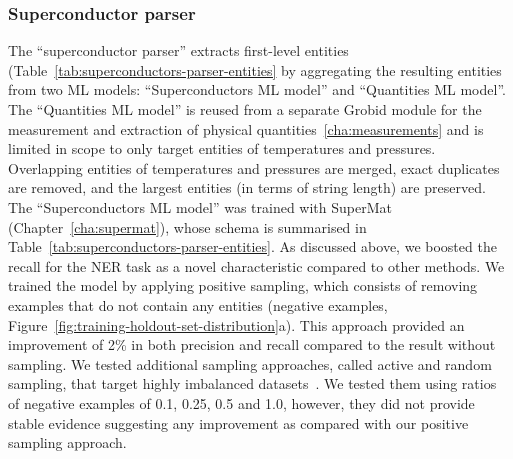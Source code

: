 \subsubsection{Superconductor parser}
The ``superconductor parser'' extracts first-level entities (Table~\ref{tab:superconductors-parser-entities} by aggregating the resulting entities from two ML models: ``Superconductors ML model'' and ``Quantities ML model''.
The ``Quantities ML model'' is reused from a separate Grobid module for the measurement and extraction of physical quantities~\ref{cha:measurements} and is limited in scope to only target entities of temperatures and pressures.
Overlapping entities of temperatures and pressures are merged, exact duplicates are removed, and the largest entities (in terms of string length) are preserved.
The ``Superconductors ML model'' was trained with SuperMat (Chapter~\ref{cha:supermat}), whose schema is summarised in Table~\ref{tab:superconductors-parser-entities}.
As discussed above, we boosted the recall for the NER task as a novel characteristic compared to other methods.
We trained the model by applying positive sampling, which consists of removing examples that do not contain any entities (negative examples, Figure~\ref{fig:training-holdout-set-distribution}a).
This approach provided an improvement of 2\% in both precision and recall compared to the result without sampling.
We tested additional sampling approaches, called active and random sampling, that target highly imbalanced datasets~\cite{lopez2021mining}. We tested them using ratios of negative examples of 0.1, 0.25, 0.5 and 1.0, however, they did not provide stable evidence suggesting any improvement as compared with our positive sampling approach. 

